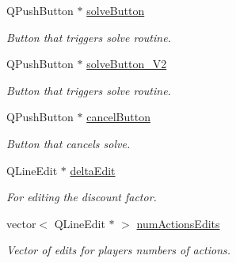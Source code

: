 \begin{DoxyCompactItemize}
\mbox{\label{classSGGameHandler_a2ea8dd4650b9ac752f26b575577def3b}} 
Q\+Push\+Button $\ast$ \hyperlink{classSGGameHandler_a2ea8dd4650b9ac752f26b575577def3b}{solve\+Button}
\begin{DoxyCompactList}\small\item\em Button that triggers solve routine. \end{DoxyCompactList}\item 
\mbox{\label{classSGGameHandler_afbb441f7d9e95ce509c0fc8198aac65b}} 
Q\+Push\+Button $\ast$ \hyperlink{classSGGameHandler_afbb441f7d9e95ce509c0fc8198aac65b}{solve\+Button\+\_\+\+V2}
\begin{DoxyCompactList}\small\item\em Button that triggers solve routine. \end{DoxyCompactList}\item 
\mbox{\label{classSGGameHandler_a667ac1db8acfa5b7aca6ace606e17e80}} 
Q\+Push\+Button $\ast$ \hyperlink{classSGGameHandler_a667ac1db8acfa5b7aca6ace606e17e80}{cancel\+Button}
\begin{DoxyCompactList}\small\item\em Button that cancels solve. \end{DoxyCompactList}\item 
\mbox{\label{classSGGameHandler_a4ac6ec9392bf0dbf0c1d7b5e9643e2a9}} 
Q\+Line\+Edit $\ast$ \hyperlink{classSGGameHandler_a4ac6ec9392bf0dbf0c1d7b5e9643e2a9}{delta\+Edit}
\begin{DoxyCompactList}\small\item\em For editing the discount factor. \end{DoxyCompactList}\item 
\mbox{\label{classSGGameHandler_af781ae067fa7402743f2f494ab4ff20f}} 
vector$<$ Q\+Line\+Edit $\ast$ $>$ \hyperlink{classSGGameHandler_af781ae067fa7402743f2f494ab4ff20f}{num\+Actions\+Edits}
\begin{DoxyCompactList}\small\item\em Vector of edits for players\textquotesingle{} numbers of actions. \end{DoxyCompactList}\item 
\mbox{\label{classSGGameHandler_afb806d54a9d193c5ab8e3a1510001fba}} 

\end{DoxyCompactItemize}
